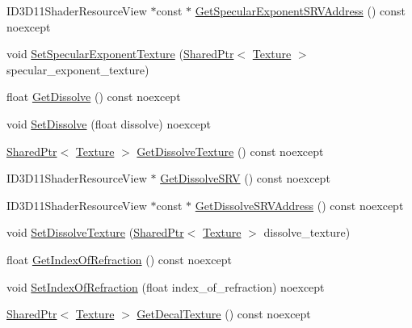 \begin{DoxyCompactItemize}
\item 
I\+D3\+D11\+Shader\+Resource\+View $\ast$const  $\ast$ \hyperlink{structmage_1_1_shaded_material_a25cfefef7f34cf03568c41b690264569}{Get\+Specular\+Exponent\+S\+R\+V\+Address} () const noexcept
\item 
void \hyperlink{structmage_1_1_shaded_material_a5ef7c32a67a49814a448667779cfcb4b}{Set\+Specular\+Exponent\+Texture} (\hyperlink{namespacemage_a1e01ae66713838a7a67d30e44c67703e}{Shared\+Ptr}$<$ \hyperlink{classmage_1_1_texture}{Texture} $>$ specular\+\_\+exponent\+\_\+texture)
\item 
float \hyperlink{structmage_1_1_shaded_material_adff98fa9d3ace697033106e04d09ac98}{Get\+Dissolve} () const noexcept
\item 
void \hyperlink{structmage_1_1_shaded_material_a403f3e4e673d31fffdb387f518393453}{Set\+Dissolve} (float dissolve) noexcept
\item 
\hyperlink{namespacemage_a1e01ae66713838a7a67d30e44c67703e}{Shared\+Ptr}$<$ \hyperlink{classmage_1_1_texture}{Texture} $>$ \hyperlink{structmage_1_1_shaded_material_a442e7331e699f4b21f59e289272a361a}{Get\+Dissolve\+Texture} () const noexcept
\item 
I\+D3\+D11\+Shader\+Resource\+View $\ast$ \hyperlink{structmage_1_1_shaded_material_ac74d2e8849300aa1e54cbce0bf8cbeff}{Get\+Dissolve\+S\+RV} () const noexcept
\item 
I\+D3\+D11\+Shader\+Resource\+View $\ast$const  $\ast$ \hyperlink{structmage_1_1_shaded_material_aa114be8c5d55096554cf75fdba75ab2d}{Get\+Dissolve\+S\+R\+V\+Address} () const noexcept
\item 
void \hyperlink{structmage_1_1_shaded_material_ab7f2f36caddb8bbdde8753424968c231}{Set\+Dissolve\+Texture} (\hyperlink{namespacemage_a1e01ae66713838a7a67d30e44c67703e}{Shared\+Ptr}$<$ \hyperlink{classmage_1_1_texture}{Texture} $>$ dissolve\+\_\+texture)
\item 
float \hyperlink{structmage_1_1_shaded_material_a4078cfbed3a919214428ab01d991b589}{Get\+Index\+Of\+Refraction} () const noexcept
\item 
void \hyperlink{structmage_1_1_shaded_material_af287d28549dc682fe4f067a6e30b71a8}{Set\+Index\+Of\+Refraction} (float index\+\_\+of\+\_\+refraction) noexcept
\item 
\hyperlink{namespacemage_a1e01ae66713838a7a67d30e44c67703e}{Shared\+Ptr}$<$ \hyperlink{classmage_1_1_texture}{Texture} $>$ \hyperlink{structmage_1_1_shaded_material_affd31417050c3fa426791fa521c03fc9}{Get\+Decal\+Texture} () const noexcept
\item 

\end{DoxyCompactItemize}
